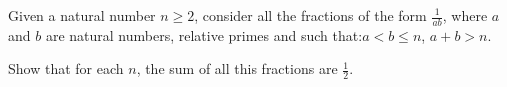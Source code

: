 Given a natural number $n \geq 2$,  consider all the fractions of the form $\frac{1}{ab}$,  where $a$ and $b$ are natural numbers, relative primes and such that:$a < b \leq n$, $a+b>n$.

Show that for each $n$,  the sum of all this fractions are $\frac12$.